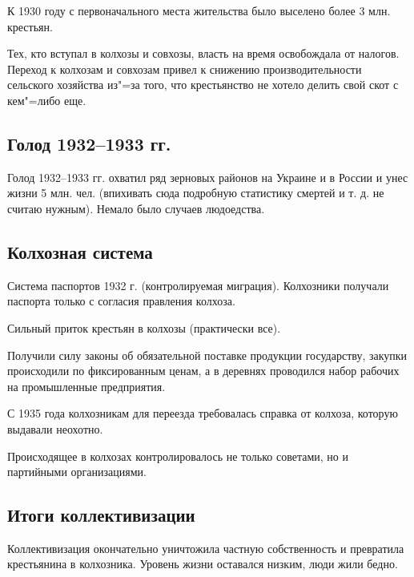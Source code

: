 К 1930 году с первоначального места жительства было выселено более 3 млн. крестьян.

Тех, кто вступал в колхозы и совхозы, власть на время освобождала от налогов. Переход к колхозам и совхозам привел к снижению производительности сельского хозяйства из"=за того, что крестьянство не хотело делить свой скот с кем"=либо еще.

\subsection{Голод 1932--1933 гг.}

Голод 1932--1933 гг. охватил ряд зерновых районов на Украине и в России и унес жизни 5 млн. чел. (впихивать сюда подробную статистику смертей и т. д. не считаю нужным). Немало было случаев людоедства.

\subsection{Колхозная система}

Система паспортов 1932 г. (контролируемая миграция).
Колхозники получали паспорта только с согласия правления колхоза.

Сильный приток крестьян в колхозы (практически все).

Получили силу законы об обязательной поставке продукции государству, закупки происходили по фиксированным ценам, а в деревнях проводился набор рабочих на промышленные предприятия. 

С 1935 года колхозникам для переезда требовалась справка от колхоза, которую выдавали неохотно.

Происходящее в колхозах контролировалось не только советами, но и партийными организациями.

\subsection{Итоги коллективизации}

Коллективизация окончательно уничтожила частную собственность и превратила крестьянина в колхозника. Уровень жизни оставался низким, люди жили бедно. 
